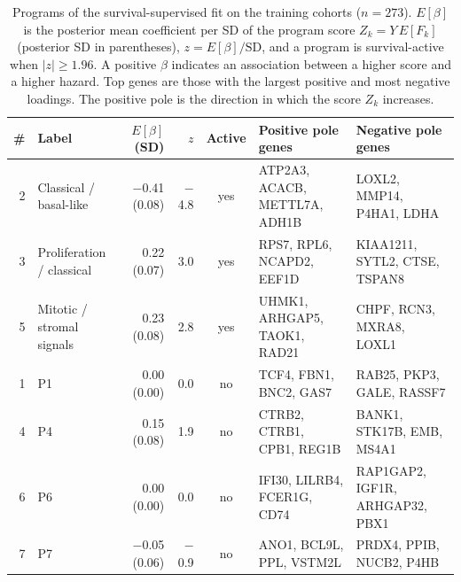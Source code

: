 \begin{table}[tbp]
\centering
\small
\setlength{\tabcolsep}{2.5pt}
\caption{Programs of the survival-supervised fit on the training cohorts ($n=273$). $E[\beta]$ is the posterior mean coefficient per SD of the program score $Z_k = Y\,E[F_k]$ (posterior SD in parentheses), $z = E[\beta]/\mathrm{SD}$, and a program is survival-active when $|z|\ge 1.96$. A positive $\beta$ indicates an association between a higher score and a higher hazard. Top genes are those with the largest positive and most negative loadings. The positive pole is the direction in which the score $Z_k$ increases.}
\label{tab:programs}
\begin{tabular}{@{}r p{1.12in} r r c p{1.3in} p{1.3in}@{}}
\toprule
\# & Label & $E[\beta]$ (SD) & $z$ & Active & Positive pole genes & Negative pole genes \\
\midrule
2 & Classical / basal-like & $-$0.41 (0.08) & $-$4.8 & yes & ATP2A3, ACACB, METTL7A, ADH1B & LOXL2, MMP14, P4HA1, LDHA \\
3 & Proliferation / classical & 0.22 (0.07) & 3.0 & yes & RPS7, RPL6, NCAPD2, EEF1D & KIAA1211, SYTL2, CTSE, TSPAN8 \\
5 & Mitotic / stromal signals & 0.23 (0.08) & 2.8 & yes & UHMK1, ARHGAP5, TAOK1, RAD21 & CHPF, RCN3, MXRA8, LOXL1 \\
1 & P1 & 0.00 (0.00) & 0.0 & no & TCF4, FBN1, BNC2, GAS7 & RAB25, PKP3, GALE, RASSF7 \\
4 & P4 & 0.15 (0.08) & 1.9 & no & CTRB2, CTRB1, CPB1, REG1B & BANK1, STK17B, EMB, MS4A1 \\
6 & P6 & 0.00 (0.00) & 0.0 & no & IFI30, LILRB4, FCER1G, CD74 & RAP1GAP2, IGF1R, ARHGAP32, PBX1 \\
7 & P7 & $-$0.05 (0.06) & $-$0.9 & no & ANO1, BCL9L, PPL, VSTM2L & PRDX4, PPIB, NUCB2, P4HB \\
\bottomrule
\end{tabular}
\end{table}
